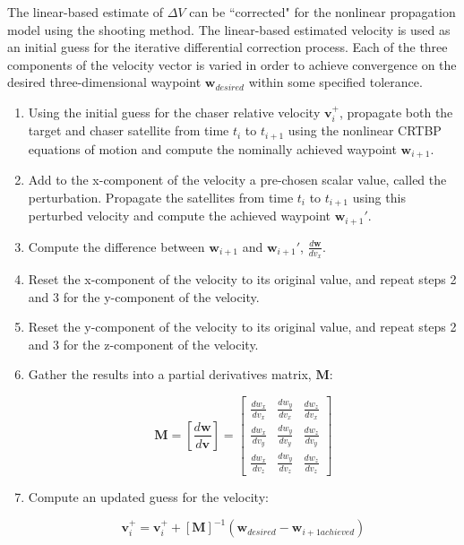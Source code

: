 \documentclass[a4paper]{article}
\begin{document}
The linear-based estimate of \(\Delta V\) can be ``corrected" for the nonlinear propagation model using the shooting method.  The linear-based estimated velocity is used as an initial guess for the iterative differential correction process.  Each of the three components of the velocity vector is varied in order to achieve convergence on the desired three-dimensional waypoint \(\mathbf{w}_{desired}\) within some specified tolerance.

\begin{enumerate}[leftmargin=!,labelindent=12pt,itemindent=0pt, label=Step \arabic*:]

	\item Using the initial guess for the chaser relative velocity \(\mathbf{v}_i^+\), propagate both the target and chaser satellite from time \(t_i\) to \(t_{i+1}\) using the nonlinear CRTBP equations of motion and compute the nominally achieved waypoint \(\mathbf{w}_{i+1}\).
	
	\item Add to the x-component of the velocity a pre-chosen scalar value, called the perturbation.  Propagate the satellites from time \(t_i\) to \(t_{i+1}\) using this perturbed velocity and compute the achieved waypoint \(\mathbf{w}_{i+1}'\).
	
	\item Compute the difference between \(\mathbf{w}_{i+1}\) and \(\mathbf{w}_{i+1}'\), \(\frac{d\mathbf{w}}{dv_x}\).
	
	\item Reset the x-component of the velocity to its original value, and repeat steps 2 and 3 for the y-component of the velocity.
	
	\item Reset the y-component of the velocity to its original value, and repeat steps 2 and 3 for the z-component of the velocity.
	
	\item Gather the results into a partial derivatives matrix, \(\mathbf{M}\):
	
	\begin{equation} \label{eq:ShootingMethodPartialDerivs}
	\mathbf{M} = \left[ \frac{d\mathbf{w}}{d\mathbf{v}} \right]
	= \begin{bmatrix}
	\frac{dw_x}{dv_x} & \frac{dw_y}{dv_x} & \frac{dw_z}{dv_x} \\[0.3em]
	\frac{dw_x}{dv_y} & \frac{dw_y}{dv_y} & \frac{dw_z}{dv_y} \\[0.3em]
	\frac{dw_x}{dv_z} & \frac{dw_y}{dv_z} & \frac{dw_z}{dv_z}
	\end{bmatrix}
	\end{equation}
	
	\item Compute an updated guess for the velocity:
	
	\begin{equation} \label{eq:ShootingMethodUpdate}
	\mathbf{v}_i^+ = \mathbf{v}_i^+ + [\mathbf{M}]^{-1}(\mathbf{w}_{desired} - \mathbf{w}_{i+1 achieved})
	\end{equation}
	
\end{enumerate}
\end{document}
